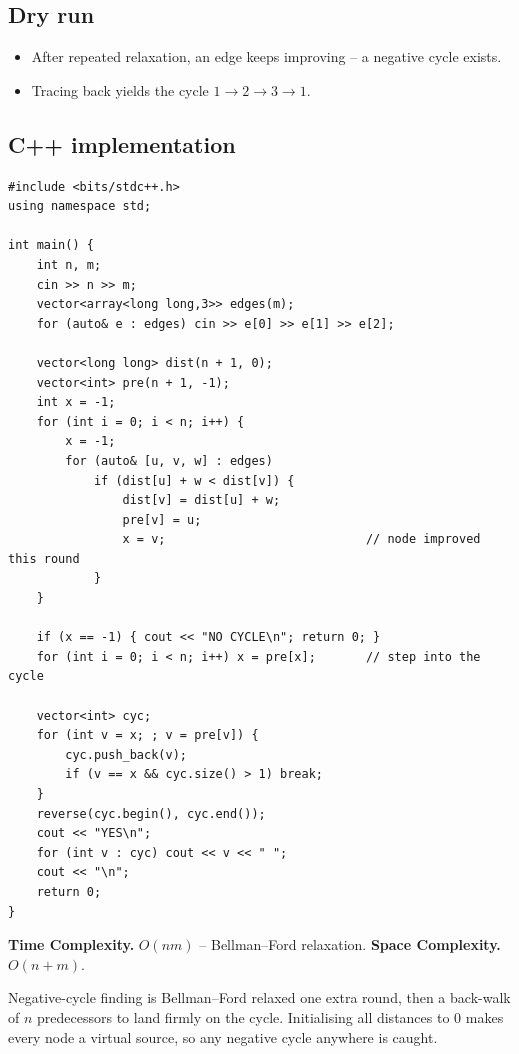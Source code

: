 \subsection*{Dry run}


\begin{itemize}
  \item After repeated relaxation, an edge keeps improving -- a negative
        cycle exists.
  \item Tracing back yields the cycle $1\to2\to3\to1$.
\end{itemize}

\subsection*{C++ implementation}

\begin{lstlisting}
#include <bits/stdc++.h>
using namespace std;

int main() {
    int n, m;
    cin >> n >> m;
    vector<array<long long,3>> edges(m);
    for (auto& e : edges) cin >> e[0] >> e[1] >> e[2];

    vector<long long> dist(n + 1, 0);
    vector<int> pre(n + 1, -1);
    int x = -1;
    for (int i = 0; i < n; i++) {
        x = -1;
        for (auto& [u, v, w] : edges)
            if (dist[u] + w < dist[v]) {
                dist[v] = dist[u] + w;
                pre[v] = u;
                x = v;                            // node improved this round
            }
    }

    if (x == -1) { cout << "NO CYCLE\n"; return 0; }
    for (int i = 0; i < n; i++) x = pre[x];       // step into the cycle

    vector<int> cyc;
    for (int v = x; ; v = pre[v]) {
        cyc.push_back(v);
        if (v == x && cyc.size() > 1) break;
    }
    reverse(cyc.begin(), cyc.end());
    cout << "YES\n";
    for (int v : cyc) cout << v << " ";
    cout << "\n";
    return 0;
}
\end{lstlisting}

\begin{complexitybox}
\textbf{Time Complexity.} $O(nm)$ -- Bellman--Ford relaxation.
\textbf{Space Complexity.} $O(n+m)$.
\end{complexitybox}

\begin{takeawaybox}
Negative-cycle finding is Bellman--Ford relaxed one extra round, then a
back-walk of $n$ predecessors to land firmly on the cycle. Initialising all
distances to $0$ makes every node a virtual source, so any negative cycle
anywhere is caught.
\end{takeawaybox}
